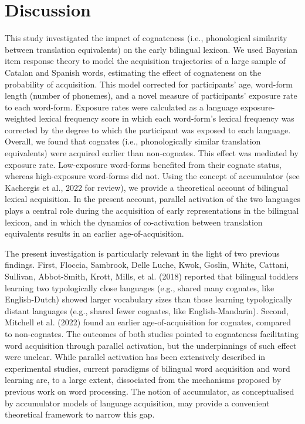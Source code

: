 \documentclass[
  12pt,
  b5paperpaper,
  twoside]{scrreprt}
\begin{document}
\hypertarget{sec-discussion2}{%
\section{Discussion}\label{sec-discussion2}}

This study investigated the impact of cognateness (i.e., phonological
similarity between translation equivalents) on the early bilingual
lexicon. We used Bayesian item response theory to model the acquisition
trajectories of a large sample of Catalan and Spanish words, estimating
the effect of cognateness on the probability of acquisition. This model
corrected for participants' age, word-form length (number of phonemes),
and a novel measure of participants' exposure rate to each word-form.
Exposure rates were calculated as a language exposure-weighted lexical
frequency score in which each word-form's lexical frequency was
corrected by the degree to which the participant was exposed to each
language. Overall, we found that cognates (i.e., phonologically similar
translation equivalents) were acquired earlier than non-cognates. This
effect was mediated by exposure rate. Low-exposure word-forms benefited
from their cognate status, whereas high-exposure word-forms did not.
Using the concept of accumulator (see Kachergis et al., 2022 for
review), we provide a theoretical account of bilingual lexical
acquisition. In the present account, parallel activation of the two
languages plays a central role during the acquisition of early
representations in the bilingual lexicon, and in which the dynamics of
co-activation between translation equivalents results in an earlier
age-of-acquisition.

The present investigation is particularly relevant in the light of two
previous findings. First, Floccia, Sambrook, Delle Luche, Kwok, Goslin,
White, Cattani, Sullivan, Abbot-Smith, Krott, Mills, et al. (2018)
reported that bilingual toddlers learning two typologically close
languages (e.g., shared many cognates, like English-Dutch) showed larger
vocabulary sizes than those learning typologically distant languages
(e.g., shared fewer cognates, like English-Mandarin). Second, Mitchell
et al. (2022) found an earlier age-of-acquisition for cognates, compared
to non-cognates. The outcomes of both studies pointed to cognateness
facilitating word acquisition through parallel activation, but the
underpinnings of such effect were unclear. While parallel activation has
been extensively described in experimental studies, current paradigms of
bilingual word acquisition and word learning are, to a large extent,
dissociated from the mechanisms proposed by previous work on word
processing. The notion of accumulator, as conceptualised by accumulator
models of language acquisition, may provide a convenient theoretical
framework to narrow this gap.
\end{document}
